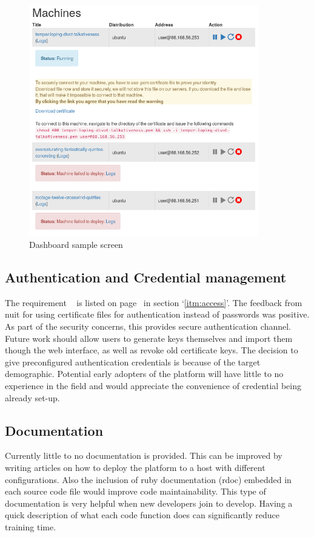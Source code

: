 \documentclass{article}
\begin{document}
\begin{figure}[H]
	\vspace{0.5cm}
	\includegraphics[width=10cm]{dashboard}
	\vspace{0.5cm}
	\caption{Dashboard sample screen}
	\label{fig:web-interface-dashboard}
\end{figure}

\subsection{Authentication and Credential management}
The requirement ~  is listed on page~\pageref{itm:access} in section `\ref{itm:access}'.
The feedback from \gls{nuit} for using certificate files for authentication instead of passwords was positive. As part of the security concerns, this provides secure authentication channel.
Future work should allow users to generate keys themselves and import them though the web interface, as well as revoke old certificate keys.
The decision to give preconfigured authentication credentials is because of the target demographic. Potential early adopters of the platform will have little to no experience in the field and would appreciate the convenience of credential being already set-up.

\subsection{Documentation}
Currently little to no documentation is provided. This can be improved by writing articles on how to deploy the platform to a host with different configurations. Also the inclusion of ruby documentation (rdoc) embedded in each source code file would improve code maintainability. This type of documentation is very helpful when new developers join to develop. Having a quick description of what each code function does can significantly reduce training time.
\end{document}
